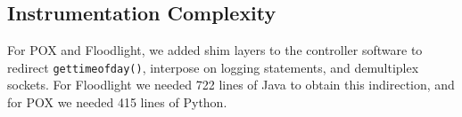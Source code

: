 
\subsection{Instrumentation Complexity}

For POX and Floodlight, we added shim layers to the controller software
to redirect {\tt gettimeofday()}, interpose on logging
statements, and demultiplex sockets. For Floodlight we needed 722 lines of Java to obtain this
indirection, and for POX we needed 415 lines of Python.


